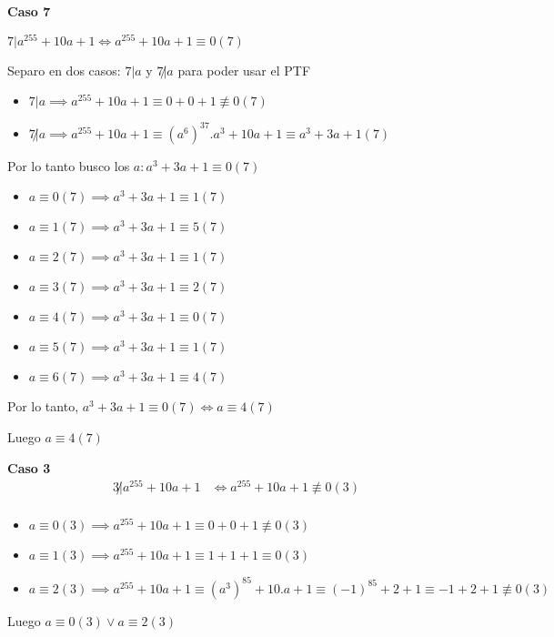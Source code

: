 \textbf{Caso 7}

$ 7 | a^{255} + 10a + 1 \iff a^{255} + 10a + 1 \equiv 0 (7) $

Separo en dos casos: $ 7|a $ y $ 7 \not | a $ para poder usar el PTF

\begin{itemize}
    \item $ 7 | a \implies a^{255} + 10a + 1 \equiv 0 + 0 + 1 \not \equiv 0 (7) $
    \item $ 7 \not | a \implies a^{255} + 10a + 1 \equiv (a^6)^{37}. a^3 + 10a + 1 \equiv a^3 + 3a + 1 (7) $
\end{itemize}

Por lo tanto busco los $a: a^3 + 3a + 1 \equiv 0(7)$

\begin{itemize}
    \item $ a \equiv 0(7) \implies a^3 + 3a + 1 \equiv 1(7) $
    \item $ a \equiv 1(7) \implies a^3 + 3a + 1 \equiv 5(7) $
    \item $ a \equiv 2(7) \implies a^3 + 3a + 1 \equiv 1(7) $
    \item $ a \equiv 3(7) \implies a^3 + 3a + 1 \equiv 2(7) $
    \item $ a \equiv 4(7) \implies a^3 + 3a + 1 \equiv 0(7) $
    \item $ a \equiv 5(7) \implies a^3 + 3a + 1 \equiv 1(7) $
    \item $ a \equiv 6(7) \implies a^3 + 3a + 1 \equiv 4(7) $
\end{itemize}
Por lo tanto, $ a^3 + 3a + 1 \equiv 0(7) \iff a \equiv 4(7) $

Luego $ a \equiv 4(7) $

\textbf{Caso 3}
\begin{align*}
    3 \not | a^{255} + 10a + 1 &\iff a^{255} + 10a + 1 \not \equiv 0 (3) \\
\end{align*}

\begin{itemize}
    \item $ a\equiv 0(3) \implies a^{255} + 10a + 1 \equiv 0 + 0 + 1 \not \equiv 0 (3) $
    \item $ a\equiv 1(3) \implies a^{255} + 10a + 1 \equiv 1 + 1 + 1 \equiv 0 (3) $
    \item $ a\equiv 2(3) \implies a^{255} + 10a + 1 \equiv (a^3)^{85} + 10.a + 1 \equiv (-1)^{85} + 2 + 1 \equiv -1+2+1 \not \equiv 0 (3) $
\end{itemize}
Luego $ a \equiv 0 (3) \vee a \equiv 2 (3) $


